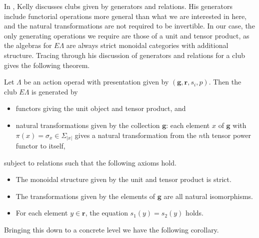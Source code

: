 
In \cite{kelly_club1}, Kelly discusses clubs given by generators and relations. His generators include functorial operations more general than what we are interested in here, and the natural transformations are not required to be invertible. In our case, the only generating operations we require are those of a unit and tensor product, as the algebras for $E\Lambda$ are always strict monoidal categories with additional structure. Tracing through his discussion of generators and relations for a club gives the following theorem.

\begin{thm}\label{thm:pres1}
Let $\Lambda$ be an action operad with presentation given by $(\mathbf{g},\mathbf{r}, s_{i}, p)$. Then the club $E\Lambda$ is generated by
\begin{itemize}
  \item functors giving the unit object and tensor product, and
  \item natural transformations given by the collection $\mathbf{g}$:  each element $x$ of $\mathbf{g}$ with $\pi(x) = \sigma_{x} \in \Sigma_{|x|}$ gives a natural transformation from the $n$th tensor power functor to itself,
\end{itemize}
subject to relations such that the following axioms hold.
\begin{itemize}
  \item The monoidal structure given by the unit and tensor product is strict.
  \item The transformations given by the elements of $\mathbf{g}$ are all natural isomorphisms.
  \item For each element $y \in \mathbf{r}$, the equation $s_{1}(y) = s_{2}(y)$ holds.
\end{itemize}
\end{thm}

Bringing this down to a concrete level we have the following corollary.

